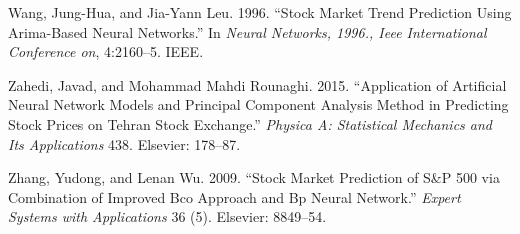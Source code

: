 \documentclass[12pt,a4paper]{article}
\numberwithin{equation}{section}
\numberwithin{figure}{section}
\numberwithin{table}{section}
\renewcommand{\baselinestretch}{1.5}
\begin{document}
\hypertarget{ref-wang1996stock}{}
Wang, Jung-Hua, and Jia-Yann Leu. 1996. ``Stock Market Trend Prediction
Using Arima-Based Neural Networks.'' In \emph{Neural Networks, 1996.,
Ieee International Conference on}, 4:2160--5. IEEE.

\hypertarget{ref-zahedi2015application}{}
Zahedi, Javad, and Mohammad Mahdi Rounaghi. 2015. ``Application of
Artificial Neural Network Models and Principal Component Analysis Method
in Predicting Stock Prices on Tehran Stock Exchange.'' \emph{Physica A:
Statistical Mechanics and Its Applications} 438. Elsevier: 178--87.

\hypertarget{ref-zhang2009stock}{}
Zhang, Yudong, and Lenan Wu. 2009. ``Stock Market Prediction of S\&P 500
via Combination of Improved Bco Approach and Bp Neural Network.''
\emph{Expert Systems with Applications} 36 (5). Elsevier: 8849--54.

\newpage
\renewcommand{\baselinestretch}{1}
\nocite{*}

\end{document}
